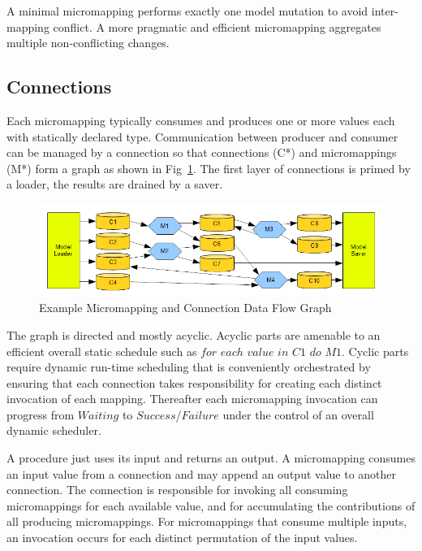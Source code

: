 \documentclass{llncs}
\begin{document}
A minimal micromapping performs exactly one model mutation to avoid inter-mapping conflict. A more pragmatic and efficient micromapping aggregates multiple non-conflicting changes.

\subsection{Connections}

Each micromapping typically consumes and produces one or more values each with  statically declared type.
Communication between producer and consumer can be managed by a connection so that connections (C*) and micromappings (M*)  form a graph as shown in Fig~\ref{fig:ExecutionContext}. The first layer of connections is primed by a loader, the results are drained by a saver.

\begin{figure}
  \begin{center}
    \includegraphics[width=4.75in]{ExecutionContext.png}
  \end{center}
  \caption{Example Micromapping and Connection Data Flow Graph}
  \label{fig:ExecutionContext}
\end{figure}

The graph is directed and mostly acyclic. Acyclic parts are amenable to an efficient overall static schedule such as $for$ $each$ $value$ $in$ $C1$ $do$ $M1$. Cyclic parts require dynamic run-time scheduling that is conveniently orchestrated by ensuring that each connection takes responsibility for creating each distinct invocation of each mapping. Thereafter each micromapping invocation can progress from $Waiting$ to $Success$/$Failure$ under the control of an overall dynamic scheduler.

A procedure just uses its input and returns an output. A micromapping consumes an input value from a connection and may append an output value to another connection. The connection is responsible for invoking all consuming micromappings for each available value, and for accumulating the contributions of all producing micromappings. For micromappings that consume multiple inputs, an invocation occurs for each distinct permutation of the input values.
\end{document}
